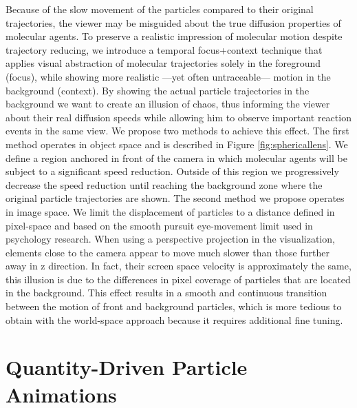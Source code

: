 Because of the slow movement of the particles compared to their original trajectories, the viewer may be misguided about the true diffusion properties of molecular agents.
To preserve a realistic impression of molecular motion despite trajectory reducing, we introduce a temporal focus+context technique that applies visual abstraction of molecular trajectories solely in the foreground (focus), while showing more realistic ---yet often untraceable--- motion in the background (context).
By showing the actual particle trajectories in the background we want to create an illusion of chaos, thus informing the viewer about their real diffusion speeds while allowing him to observe important reaction events in the same view.
We propose two methods to achieve this effect.
The first method operates in object space and is described in Figure \ref{fig:sphericallens}.
We define a region anchored in front of the camera in which molecular agents will be subject to a significant speed reduction.
Outside of this region we progressively decrease the speed reduction until reaching the background zone where the original particle trajectories are shown.
The second method we propose operates in image space.
We limit the displacement of particles to a distance defined in pixel-space and based on the smooth pursuit eye-movement limit used in psychology research.
When using a perspective projection in the visualization, elements close to the camera appear to move much slower than those further away in z direction. 
In fact, their screen space velocity is approximately the same, this illusion is due to the differences in pixel coverage of particles that are located in the background.
This effect results in a smooth and continuous transition between the motion of front and background particles, which is more tedious to obtain with the world-space approach because it requires additional fine tuning.

\section{Quantity-Driven Particle Animations}

